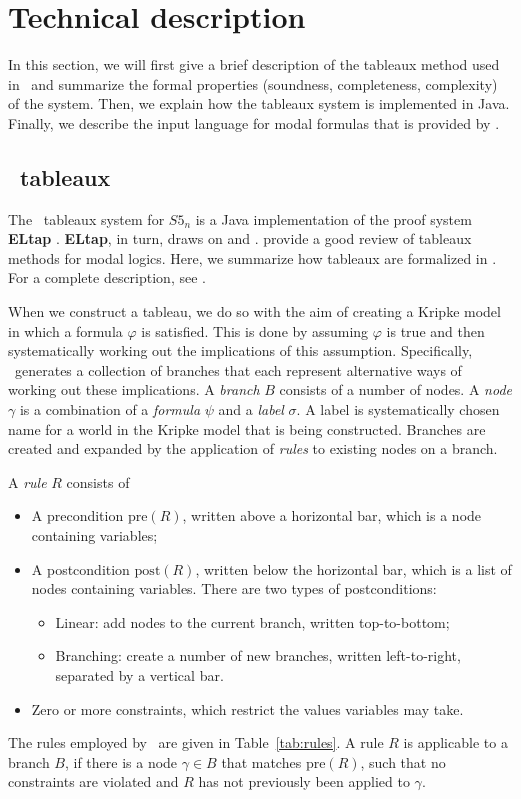 \section{Technical description}

In this section, we will first give a brief description of the tableaux method
used in \oops\ and summarize the formal properties (soundness, completeness,
complexity) of the system. Then, we explain how the
tableaux system is implemented in Java. Finally, we describe the input language
for modal formulas that is provided by \oops.

\subsection{\oops\ tableaux}

The \oops\ tableaux system for $S5_n$ is a Java \citep{gosling2005}
implementation of the proof system {\bf ELtap} \citep{deboer2006}.  {\bf
ELtap}, in turn, draws on \citet{fitting1999} and \citet{beckert1997}.
\citet{halpern1992} provide a good review of tableaux methods for modal logics.
Here, we summarize how tableaux are formalized in \oops. For a complete
description, see \citet{valkenhoef2008}.

When we construct a tableau, we do so with the aim of creating a Kripke model
in which a formula $\varphi$ is satisfied. This is done by assuming $\varphi$
is true and then systematically working out the implications of this
assumption. Specifically, \oops\ generates a collection of branches that each
represent alternative ways of working out these implications. A {\em branch}
$B$ consists of a number of nodes. A {\em node} $\gamma$ is a combination of a
{\em formula} $\psi$ and a {\em label} $\sigma$. A label is systematically
chosen name for a world in the Kripke model that is being constructed. Branches
are created and expanded by the application of {\em rules} to existing nodes on
a branch. 



A {\em rule} $R$ consists of
\begin{itemize}
\item A precondition $\mathrm{pre}(R)$, written above a horizontal bar, which
is a node containing variables;
\item A postcondition $\mathrm{post}(R)$, written below the horizontal bar,
which is a list of nodes containing variables. There are two types of
postconditions:
\begin{itemize}
\item Linear: add nodes to the current branch, written top-to-bottom;
\item Branching: create a number of new branches, written left-to-right, separated by a vertical bar.
\end{itemize}
\item Zero or more constraints, which restrict the values variables may take.
\end{itemize}
The rules employed by \oops\ are given in Table~\ref{tab:rules}. A rule $R$ is
applicable to a branch $B$, if there is a node $\gamma \in B$ that matches
$\mathrm{pre}(R)$, such that no constraints are violated and $R$ has not
previously been applied to $\gamma$.

